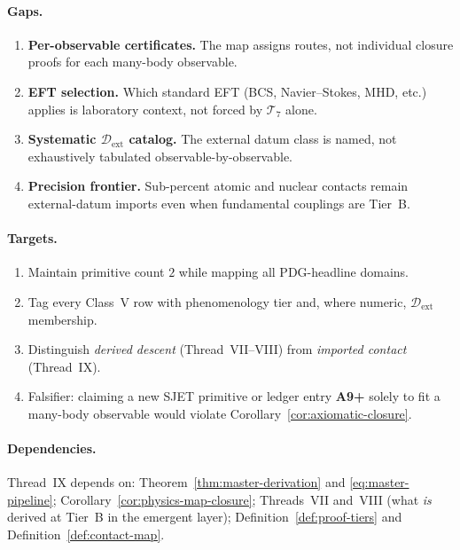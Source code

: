 \paragraph{Gaps.}
\begin{enumerate}[label=(\roman*),leftmargin=*]
  \item \textbf{Per-observable certificates.} The map assigns routes, not
    individual closure proofs for each many-body observable.
  \item \textbf{EFT selection.} Which standard EFT (BCS, Navier--Stokes, MHD,
    etc.) applies is laboratory context, not forced by $\mathcal{T}_7$ alone.
  \item \textbf{Systematic $\mathcal{D}_{\mathrm{ext}}$ catalog.} The external
    datum class is named, not exhaustively tabulated observable-by-observable.
  \item \textbf{Precision frontier.} Sub-percent atomic and nuclear contacts
    remain external-datum imports even when fundamental couplings are Tier~B.
\end{enumerate}

\paragraph{Targets.}
\begin{enumerate}[label=(\roman*),leftmargin=*]
  \item Maintain primitive count $2$ while mapping all PDG-headline domains.
  \item Tag every Class~V row with phenomenology tier and, where numeric,
    $\mathcal{D}_{\mathrm{ext}}$ membership.
  \item Distinguish \emph{derived descent} (Thread~VII--VIII) from
    \emph{imported contact} (Thread~IX).
  \item Falsifier: claiming a new SJET primitive or ledger entry
    \textbf{A9+} solely to fit a many-body observable would violate
    Corollary~\ref{cor:axiomatic-closure}.
\end{enumerate}

\paragraph{Dependencies.}
Thread~IX depends on:
Theorem~\ref{thm:master-derivation} and \eqref{eq:master-pipeline};
Corollary~\ref{cor:physics-map-closure};
Threads~VII and~VIII (what \emph{is} derived at Tier~B in the emergent layer);
Definition~\ref{def:proof-tiers} and Definition~\ref{def:contact-map}.

